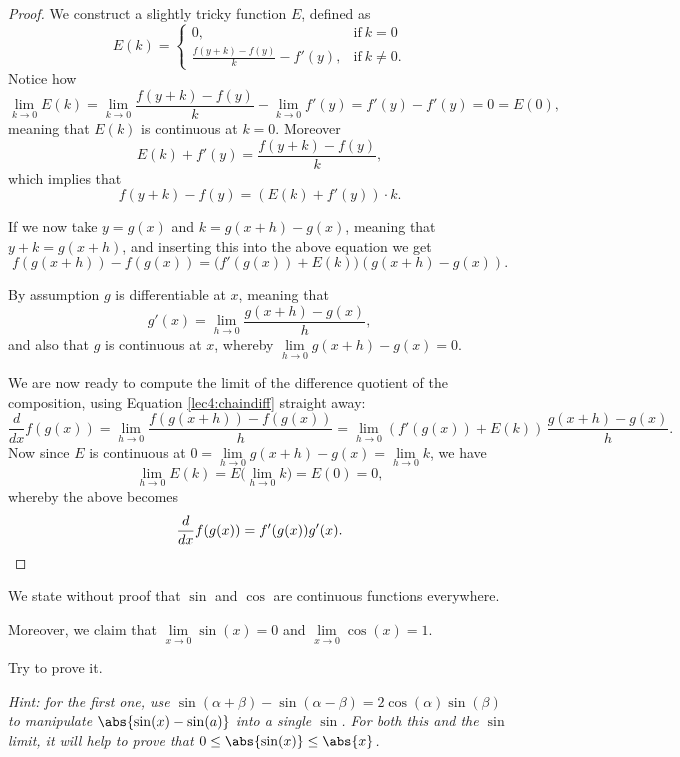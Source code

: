 \begin{proof}
	We construct a slightly tricky function $E$, defined as
	\[
		E(k) = \begin{cases}
		0, & \text{if}~ k = 0 \\
		\frac{f(y + k) - f(y)}{k} - f'(y), & \text{if}~ k \neq 0.
		\end{cases}
	\]
	Notice how
	\[
		\lim_{k \to 0} E(k) = \lim_{k \to 0} \frac{f(y + k) - f(y)}{k} - \lim_{k \to 0} f'(y) = f'(y) - f'(y) = 0 = E(0),
	\]
	meaning that $E(k)$ is continuous at $k = 0$.
	Moreover
	\[
		E(k) + f'(y) = \frac{f(y + k) - f(y)}{k},
	\]
	which implies that
	\[
		f(y + k) - f(y) = (E(k) + f'(y)) \cdot k.
	\]

	\noindent
	If we now take $y = g(x)$ and $k = g(x + h) - g(x)$, meaning that $y + k = g(x + h)$, and inserting this into the above equation we get
	\begin{equation}\label{lec4:chaindiff}
		f(g(x + h)) - f(g(x)) = \big (f'(g(x)) + E(k) \big ) (g(x + h) - g(x)).
	\end{equation}

	\noindent
	By assumption $g$ is differentiable at $x$, meaning that
	\[
		g'(x) = \lim_{h \to 0} \frac{g(x + h) - g(x)}{h},
	\]
	and also that $g$ is continuous at $x$, whereby $\lim\limits_{h \to 0} g(x + h) - g(x) = 0$.

	We are now ready to compute the limit of the difference quotient of the composition, using Equation \ref{lec4:chaindiff} straight away:
	\[
		\frac{d}{d x} f(g(x)) = \lim_{h \to 0} \frac{f(g(x + h)) - f(g(x))}{h} = \lim_{h \to 0} (f'(g(x)) + E(k)) \, \frac{g(x + h) - g(x)}{h}.
	\]
	Now since $E$ is continuous at $0 = \lim\limits_{h \to 0} g(x + h) - g(x) = \lim\limits_{h \to 0} k$, we have
	\[
		\lim_{h \to 0} E(k) = E \Big ( \lim_{h \to 0} k \Big ) = E(0) = 0,
	\]
	whereby the above becomes
	\[
		\frac{d}{d x} f(g(x)) = f'(g(x)) g'(x). \qedhere
	\]
\end{proof}


We state without proof that $\sin$ and $\cos$ are continuous functions everywhere.

Moreover, we claim that $\lim\limits_{x \to 0} \sin(x) = 0$ and $\lim\limits_{x \to 0} \cos(x) = 1$.

\begin{exercise}
	Try to prove it.

	\emph{Hint: for the first one, use $\sin(\alpha + \beta) - \sin(\alpha - \beta) = 2 \cos(\alpha)\sin(\beta)$ to manipulate $\abs{\sin(x) - \sin(a)}$ into a single $\sin$.
	For both this and the $\sin$ limit, it will help to prove that $0 \leq \abs{\sin(x)} \leq \abs{x}$.}
\end{exercise}

